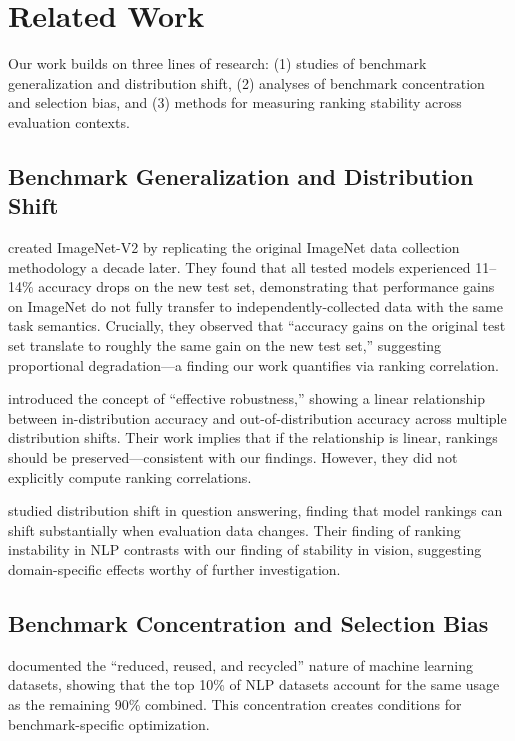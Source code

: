 \section{Related Work}
\label{sec:related_work}

Our work builds on three lines of research: (1) studies of benchmark generalization and distribution shift, (2) analyses of benchmark concentration and selection bias, and (3) methods for measuring ranking stability across evaluation contexts.

\subsection{Benchmark Generalization and Distribution Shift}

\citet{recht2019imagenet} created ImageNet-V2 by replicating the original ImageNet data collection methodology a decade later. They found that all tested models experienced 11--14\% accuracy drops on the new test set, demonstrating that performance gains on ImageNet do not fully transfer to independently-collected data with the same task semantics. Crucially, they observed that ``accuracy gains on the original test set translate to roughly the same gain on the new test set,'' suggesting proportional degradation---a finding our work quantifies via ranking correlation.

\citet{taori2020measuring} introduced the concept of ``effective robustness,'' showing a linear relationship between in-distribution accuracy and out-of-distribution accuracy across multiple distribution shifts. Their work implies that if the relationship is linear, rankings should be preserved---consistent with our findings. However, they did not explicitly compute ranking correlations.

\citet{miller2021effect} studied distribution shift in question answering, finding that model rankings can shift substantially when evaluation data changes. Their finding of ranking instability in NLP contrasts with our finding of stability in vision, suggesting domain-specific effects worthy of further investigation.

\subsection{Benchmark Concentration and Selection Bias}

\citet{koch2021reduced} documented the ``reduced, reused, and recycled'' nature of machine learning datasets, showing that the top 10\% of NLP datasets account for the same usage as the remaining 90\% combined. This concentration creates conditions for benchmark-specific optimization.

